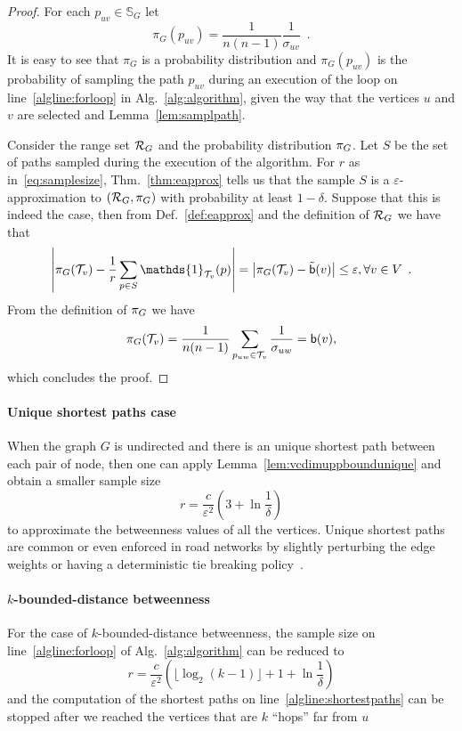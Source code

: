 \begin{proof}
  For each $p_{uv}\in\mathbb{S}_G$ let
  \[
  \pi_G(p_{uv})=\frac{1}{n(n-1)}\frac{1}{\sigma_{uv}}\enspace.
  \]
  It is easy to see that $\pi_G$ is a probability distribution and
  $\pi_G(p_{uv})$ is the probability of sampling the path $p_{uv}$ during an
  execution of the loop on line~\ref{algline:forloop} in
  Alg.~\ref{alg:algorithm}, given the way that the vertices $u$ and $v$ are
  selected and Lemma~\ref{lem:samplpath}.
  
  Consider the range set $\mathcal{R}_G$ and the probability distribution $\pi_G$.
  Let $S$ be the set of paths sampled during the execution of the algorithm.
  For $r$ as in~\eqref{eq:samplesize}, Thm.~\ref{thm:eapprox} tells us that the sample $S$ is a
  $\varepsilon$-approximation to $(\mathcal{R}_G,\pi_G)$ with probability at least
  $1-\delta$. Suppose that this is indeed the case, then from
  Def.~\ref{def:eapprox} and the definition of $\mathcal{R}_G$ we have that
  \[
  \left|\prob_G(\mathcal{T}_v) - \frac{1}{r}\sum_{p\in
  S}\mathds{1}_{\mathcal{T}_v}(p)\right|=\left|\prob_G(\mathcal{T}_v) -
  \tilde\betw(v)\right|\le\varepsilon, \forall v\in
  V\enspace.
  \]
  From the definition of $\pi_G$ we have
  \[
  \pi_G(\mathcal{T}_v)=\frac{1}{n(n-1)}\sum_{p_{uw}\in\mathcal{T}_v}\frac{1}{\sigma_{uw}}=\mathsf{b}(v),
  \]
  which concludes the proof.
\end{proof}

\paragraph{Unique shortest paths case} When the graph $G$ is undirected and
there is an unique shortest path between each pair of node, then one can apply
Lemma~\ref{lem:vcdimuppboundunique} and obtain a smaller sample size
\[
  r= \frac{c}{\varepsilon^2}\left(3+\ln\frac{1}{\delta}\right)
\]
to approximate the betweenness values of all the vertices. Unique shortest
paths are common or even enforced in road networks by
slightly perturbing the edge weights or having a deterministic tie breaking
policy~\citep{GeisbergerSS08}.

\paragraph{$k$-bounded-distance betweenness} For the case of
$k$-bounded-distance betweenness, the sample size on line~\ref{algline:forloop}
of Alg.~\ref{alg:algorithm} can be reduced to 
\[ 
  r= \frac{c}{\varepsilon^2}\left(\lfloor\log_2(k-1)\rfloor + 1 +\ln\frac{1}{\delta}\right)
\]
and the computation of the shortest paths on line~\ref{algline:shortestpaths}
can be stopped after we reached the vertices that are $k$ ``hops'' far from $u$

